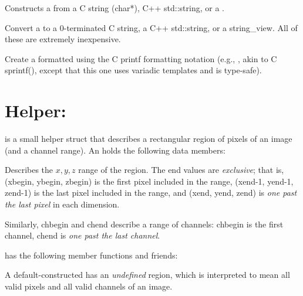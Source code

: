 Constructs a \ustring from a C string ({\cf char*}), C++ {\cf std::string},
or a \stringview.
\apiend

Convert a \ustring to a 0-terminated C string, a C++ {\cf std::string}, or
a {\cf string_view}.  All of these are extremely inexpensive.
\apiend

Create a formatted \ustring using the C printf formatting notation
(e.g., , akin to C {\cf sprintf()}, except that this one
uses variadic templates and is type-safe).
\apiend



\section{Helper: \ROI}
\label{sec:ROI}

\ROI is a small helper struct that describes a rectangular region of
pixels of an image (and a channel range).  An \ROI holds the following
data members:

Describes the $x, y, z$ range of the region.  The {\cf end} values are
\emph{exclusive}; that is, ({\cf xbegin, ybegin, zbegin}) is the first
pixel included in the range, ({\cf xend-1, yend-1, zend-1}) is the last
pixel included in the range, and ({\cf xend, yend, zend}) is \emph{one
past the last pixel} in each dimension.

Similarly, {\cf chbegin} and {\cf chend} describe a range of channels:
{\cf chbegin} is the first channel, {\cf chend} is \emph{one past the last
channel}.
\apiend

\smallskip

\noindent \ROI has the following member functions and friends:

\smallskip

A default-constructed \ROI has an \emph{undefined} region, which
is interpreted to mean all valid pixels and all valid channels of
an image.
\apiend

